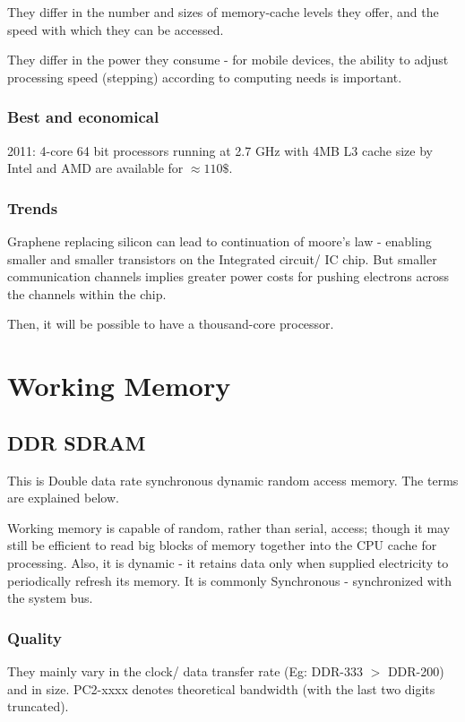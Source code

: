 \documentclass[oneside, article]{memoir}
\begin{document}
They differ in the number and sizes of memory-cache levels they offer, and the speed with which they can be accessed.

They differ in the power they consume - for mobile devices, the ability to adjust processing speed (stepping) according to computing needs is important.

\subsubsection{Best and economical}
2011: 4-core 64 bit processors running at 2.7 GHz with 4MB L3 cache size by Intel and AMD are available for $\approx 110\$$.

\subsubsection{Trends}
Graphene replacing silicon can lead to continuation of moore's law - enabling smaller and smaller transistors on the Integrated circuit/ IC chip. But smaller communication channels implies greater power costs for pushing electrons across the channels within the chip.

Then, it will be possible to have a thousand-core processor.

\section{Working Memory}
\subsection{DDR SDRAM}
This is Double data rate synchronous dynamic random access memory. The terms are explained below.

Working memory is capable of random, rather than serial, access; though it may still be efficient to read big blocks of memory together into the CPU cache for processing. Also, it is dynamic - it retains data only when supplied electricity to periodically refresh its memory. It is commonly Synchronous - synchronized with the system bus.


\subsubsection{Quality}
They mainly vary in the clock/ data transfer rate (Eg: DDR-333 $>$ DDR-200) and in size. PC2-xxxx denotes theoretical bandwidth (with the last two digits truncated).
\end{document}

